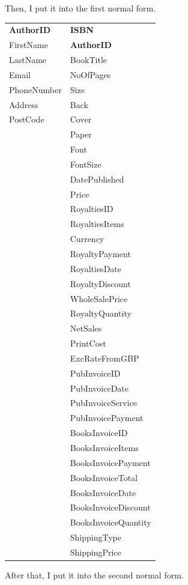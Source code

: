 \newpage
Then, I put it into the first normal form.

\begin{tabular}{|p{2.5cm}|p{3.5cm}|}
    \hline
    \textbf{AuthorID} & \textbf{ISBN} \\
    FirstName & \textbf{AuthorID} \\
    LastName & BookTitle \\
    Email & NoOfPages \\
    PhoneNumber & Size \\
    Address & Back \\
    PostCode & Cover \\
    & Paper \\
    & Font \\
    & FontSize \\
    & DatePublished\\
    & Price \\
    & RoyaltiesID \\
    & RoyaltiesItems \\
    & Currency \\
    & RoyaltyPayment \\
    & RoyaltiesDate \\
    & RoyaltyDiscount \\
    & WholeSalePrice \\
    & RoyaltyQuantity \\
    & NetSales \\
    & PrintCost \\
    & ExcRateFromGBP \\
    & PubInvoiceID \\
    & PubInvoiceDate \\
    & PubInvoiceService \\
    & PubInvoicePayment \\
    & BooksInvoiceID \\
    & BooksInvoiceItems \\
    & BooksInvoicePayment \\
    & BooksInvoiceTotal \\
    & BooksInvoiceDate \\
    & BooksInvoiceDiscount \\
    & BooksInvoiceQuantity \\
    & ShippingType \\
    & ShippingPrice \\
    \hline
\end{tabular}

\newpage
After that, I put it into the second normal form.

